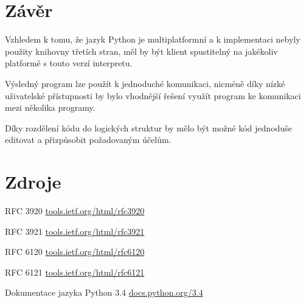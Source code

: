 \documentclass[11pt,a4paper]{article}
\begin{document}
  \section{Závěr}

  Vzhledem k tomu, že jazyk Python je multiplatformní a k implementaci nebyly
  použity knihovny třetích stran, měl by být klient spustitelný na jakékoliv
  platformě s touto verzí interpretu.

  Výsledný program lze použít k jednoduché komunikaci, nicméně díky nízké
  uživatelské přístupnosti by bylo vhodnější řešení využít program
  ke komunikaci mezi několika programy.

  Díky rozdělení kódu do logických struktur by mělo být možné kód jednoduše
  editovat a přizpůsobit požadovaným účelům.

  \section{Zdroje}

    \begin{enumerate}[label={[\arabic*]}]
      \item RFC 3920 \href{https://tools.ietf.org/html/rfc3920}
                          {tools.ietf.org/html/rfc3920}
      \item RFC 3921 \href{https://tools.ietf.org/html/rfc3921}
                          {tools.ietf.org/html/rfc3921}
      \item RFC 6120 \href{https://tools.ietf.org/html/rfc6120}
                          {tools.ietf.org/html/rfc6120}
      \item RFC 6121 \href{https://tools.ietf.org/html/rfc6121}
                          {tools.ietf.org/html/rfc6121}
      \item Dokumentace jazyka Python 3.4 \href{https://docs.python.org/3.4/}
                                               {docs.python.org/3.4}

    \end{enumerate}
\end{document}
